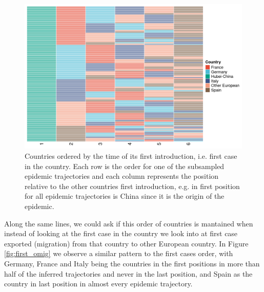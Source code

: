 \documentclass[12pt]{article}
\begin{document}
\begin{figure}[ht]
    \centering
    \includegraphics[width=\textwidth]{201030_europe3_figtraj05.png}
    \caption{Countries ordered by the time of its first introduction, i.e. first case in the country. Each row is the order for one of the subsampled epidemic trajectories and each column represents the position relative to the other countries first introduction, e.g. in first position for all epidemic trajectories is China since it is the origin of the epidemic.} 
    \label{fig:first_imig}
\end{figure}

Along the same lines, we could ask if this order of countries is mantained when instead of looking at the first case in the country we look into at first case exported (migration) from that country to other European country. In Figure \ref{fig:first_omig} we observe a similar pattern to the first cases order, with Germany, France and Italy being the countries in the first positions in more than half of the inferred trajectories and never in the last position, and Spain as the country in last position in almost every epidemic trajectory.\\
\end{document}
